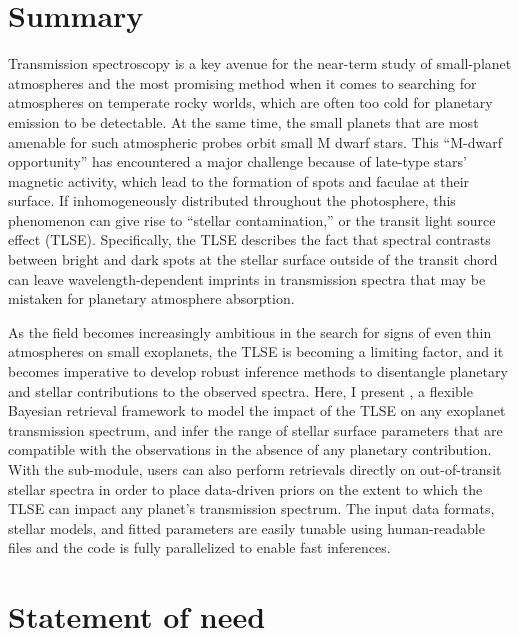 \documentclass[10pt,a4paper,onecolumn]{article}
\let\textttOrig=\texttt
\def\texttt#1{\expandafter\textttOrig{\seqsplit{#1}}}
\begin{document}
\hypertarget{summary}{%
\section{Summary}\label{summary}}

Transmission spectroscopy is a key avenue for the near-term study of
small-planet atmospheres and the most promising method when it comes to
searching for atmospheres on temperate rocky worlds, which are often too
cold for planetary emission to be detectable. At the same time, the
small planets that are most amenable for such atmospheric probes orbit
small M dwarf stars. This ``M-dwarf opportunity'' has encountered a
major challenge because of late-type stars' magnetic activity, which
lead to the formation of spots and faculae at their surface. If
inhomogeneously distributed throughout the photosphere, this phenomenon
can give rise to ``stellar contamination,'' or the transit light source
effect (TLSE). Specifically, the TLSE describes the fact that spectral
contrasts between bright and dark spots at the stellar surface outside
of the transit chord can leave wavelength-dependent imprints in
transmission spectra that may be mistaken for planetary atmosphere
absorption.

As the field becomes increasingly ambitious in the search for signs of
even thin atmospheres on small exoplanets, the TLSE is becoming a
limiting factor, and it becomes imperative to develop robust inference
methods to disentangle planetary and stellar contributions to the
observed spectra. Here, I present \texttt{stctm}, a flexible Bayesian
retrieval framework to model the impact of the TLSE on any exoplanet
transmission spectrum, and infer the range of stellar surface parameters
that are compatible with the observations in the absence of any
planetary contribution. With the \texttt{exotune} sub-module, users can
also perform retrievals directly on out-of-transit stellar spectra in
order to place data-driven priors on the extent to which the TLSE can
impact any planet's transmission spectrum. The input data formats,
stellar models, and fitted parameters are easily tunable using
human-readable files and the code is fully parallelized to enable fast
inferences.

\hypertarget{statement-of-need}{%
\section{Statement of need}\label{statement-of-need}}
\end{document}
